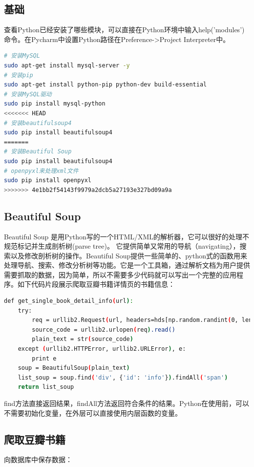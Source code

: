\documentclass[letter]{book}
\begin{document}
\subsection{基础}

查看Python已经安装了哪些模块，可以直接在Python环境中输入help('modules')命令。在Pycharm中设置Python路径在Preference->Project Interpreter中。

\begin{lstlisting}[language=Bash]
# 安装MySQL
sudo apt-get install mysql-server -y
# 安装pip
sudo apt-get install python-pip python-dev build-essential
# 安装MySQL驱动
sudo pip install mysql-python
<<<<<<< HEAD
# 安装beautifulsoup4
sudo pip install beautifulsoup4
=======
# 安装Beautiful Soup
sudo pip install beautifulsoup4
# openpyxl来处理xml文件
sudo pip install openpyxl
>>>>>>> 4e1bb2f54143f9979a2dcb5a27193e327bd09a9a
\end{lstlisting}

\subsection{Beautiful Soup}

Beautiful Soup 是用Python写的一个HTML/XML的解析器，它可以很好的处理不规范标记并生成剖析树(parse tree)。 它提供简单又常用的导航（navigating），搜索以及修改剖析树的操作。Beautiful Soup提供一些简单的、python式的函数用来处理导航、搜索、修改分析树等功能。它是一个工具箱，通过解析文档为用户提供需要抓取的数据，因为简单，所以不需要多少代码就可以写出一个完整的应用程序。如下代码片段展示爬取豆瓣书籍详情页的书籍信息：

\begin{lstlisting}[language=Bash]
def get_single_book_detail_info(url):
	try:
		req = urllib2.Request(url, headers=hds[np.random.randint(0, len(hds))])
		source_code = urllib2.urlopen(req).read()
		plain_text = str(source_code)
	except (urllib2.HTTPError, urllib2.URLError), e:
		print e
	soup = BeautifulSoup(plain_text)
	list_soup = soup.find('div', {'id': 'info'}).findAll('span')
	return list_soup
\end{lstlisting}

find方法直接返回结果，findAll方法返回符合条件的结果。Python在使用前，可以不需要初始化变量，在外层可以直接使用内层函数的变量。

\subsection{爬取豆瓣书籍}

向数据库中保存数据：
\end{document}
